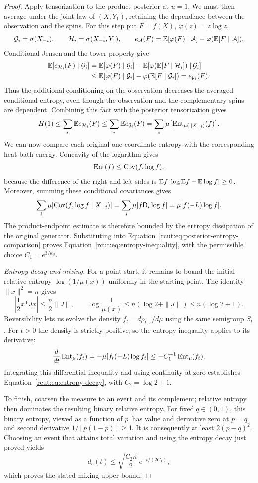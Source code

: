 \begin{proof}
Apply tensorization to the product posterior at $u=1$.  We must then
average under the joint law of $(X,Y_1)$, retaining the dependence between
the observation and the spins.  For this step put $F=f(X)$,
$\varphi(z)=z\log z$,
\[
 \mathcal G_i=\sigma(X_{-i}),\qquad
 \mathcal H_i=\sigma(X_{-i},Y_1),\qquad
 e_{\mathcal A}(F)=\mathbb E[\varphi(F)\mid\mathcal A]
                   -\varphi(\mathbb E[F\mid\mathcal A]).
\]
Conditional Jensen and the tower property give
\begin{align*}
 \mathbb E[e_{\mathcal H_i}(F)\mid\mathcal G_i]
 &=\mathbb E[\varphi(F)\mid\mathcal G_i]
   -\mathbb E[\varphi(\mathbb E[F\mid\mathcal H_i])\mid\mathcal G_i]\\
 &\le\mathbb E[\varphi(F)\mid\mathcal G_i]
       -\varphi(\mathbb E[F\mid\mathcal G_i])
 =e_{\mathcal G_i}(F).
\end{align*}
Thus the additional conditioning on the observation decreases the
averaged conditional entropy, even though the observation and the
complementary spins are dependent.  Combining this fact with the
posterior tensorization gives
\[
 H(1)\le\sum_i\mathbb E e_{\mathcal H_i}(F)
      \le\sum_i\mathbb E e_{\mathcal G_i}(F)
      =\sum_i\mu\bigl[\operatorname{Ent}_{\mu(\cdot\mid X_{-i})}(f)\bigr].
\]
We can now compare each original one-coordinate entropy with the
corresponding heat-bath energy.  Concavity of the logarithm gives
\[
 \operatorname{Ent}(f)\le\operatorname{Cov}(f,\log f),
\]
because the difference of the right and left sides is
$\mathbb E f\,[\log\mathbb E f-\mathbb E\log f]\ge0$.
Moreover, summing these conditional covariances gives
\[
 \sum_i\mu[\operatorname{Cov}(f,\log f\mid X_{-i})]
 =\sum_i\mu[f\mathsf D_i\log f]
 =\mu[f(-L)\log f].
\]
The product-endpoint estimate is therefore bounded by the entropy
dissipation of the original generator.  Substituting into
Equation~\eqref{rcut:eq:posterior-entropy-comparison} proves
Equation~\eqref{rcut:eq:entropy-inequality}, with the permissible choice
$C_1=e^{3/\kappa_\beta}$.

\medskip
\noindent\emph{Entropy decay and mixing.}
For a point start, it remains to bound the initial relative entropy
$\log(1/\mu(x))$ uniformly in the starting point.  The identity
$\|x\|^2=n$ gives
\[
 \left|\frac12x^{\mathsf T}Jx\right|\le\frac n2\|J\|,
 \qquad
 \log\frac1{\mu(x)}\le n(\log2+\|J\|)\le n(\log2+1).
\]
Reversibility lets us evolve the density $f_t=d\rho_{t,x}/d\mu$ using
the same semigroup $S_t$.  For $t>0$ the density is strictly positive,
so the entropy inequality applies to its derivative:
\[
 \frac{d}{dt}\operatorname{Ent}_\mu(f_t)
   =-\mu[f_t(-L)\log f_t]
   \le-C_1^{-1}\operatorname{Ent}_\mu(f_t).
\]
Integrating this differential inequality and using continuity at zero
establishes Equation~\eqref{rcut:eq:entropy-decay}, with
$C_2=\log2+1$.

To finish, coarsen the measure to an event and its complement; relative
entropy then dominates the resulting binary relative entropy.  For
fixed $q\in(0,1)$, this binary entropy, viewed as a function of $p$,
has value and derivative zero at $p=q$ and second derivative
$1/[p(1-p)]\ge4$.  It is consequently at least $2(p-q)^2$.
Choosing an event that attains total variation and using the entropy
decay just proved yields
\[
 d_c(t)\le\sqrt{\frac{C_2n}{2}}\,e^{-t/(2C_1)},
\]
which proves the stated mixing upper bound.
\end{proof}
